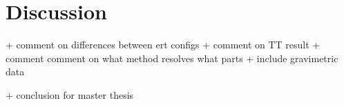 \section{Discussion}\label{section:Discussion}
+ comment on differences between ert configs
+ comment on TT result
+ comment comment  on what method resolves what parts
+ include gravimetric data 

+ conclusion for master thesis